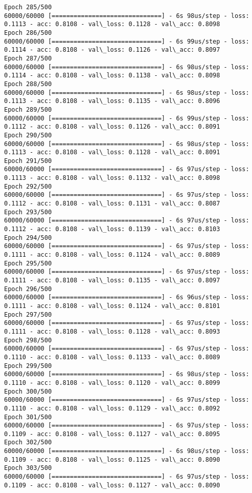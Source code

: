 \documentclass[11pt]{article}
\begin{document}
\begin{Verbatim}[commandchars=\\\{\}]
Epoch 285/500
60000/60000 [==============================] - 6s 98us/step - loss: 0.1113 - acc: 0.8108 - val\_loss: 0.1128 - val\_acc: 0.8098
Epoch 286/500
60000/60000 [==============================] - 6s 99us/step - loss: 0.1114 - acc: 0.8108 - val\_loss: 0.1126 - val\_acc: 0.8097
Epoch 287/500
60000/60000 [==============================] - 6s 98us/step - loss: 0.1114 - acc: 0.8108 - val\_loss: 0.1138 - val\_acc: 0.8098
Epoch 288/500
60000/60000 [==============================] - 6s 98us/step - loss: 0.1113 - acc: 0.8108 - val\_loss: 0.1135 - val\_acc: 0.8096
Epoch 289/500
60000/60000 [==============================] - 6s 99us/step - loss: 0.1112 - acc: 0.8108 - val\_loss: 0.1126 - val\_acc: 0.8091
Epoch 290/500
60000/60000 [==============================] - 6s 98us/step - loss: 0.1113 - acc: 0.8108 - val\_loss: 0.1128 - val\_acc: 0.8091
Epoch 291/500
60000/60000 [==============================] - 6s 97us/step - loss: 0.1113 - acc: 0.8108 - val\_loss: 0.1132 - val\_acc: 0.8098
Epoch 292/500
60000/60000 [==============================] - 6s 97us/step - loss: 0.1112 - acc: 0.8108 - val\_loss: 0.1131 - val\_acc: 0.8087
Epoch 293/500
60000/60000 [==============================] - 6s 97us/step - loss: 0.1112 - acc: 0.8108 - val\_loss: 0.1139 - val\_acc: 0.8103
Epoch 294/500
60000/60000 [==============================] - 6s 97us/step - loss: 0.1111 - acc: 0.8108 - val\_loss: 0.1124 - val\_acc: 0.8089
Epoch 295/500
60000/60000 [==============================] - 6s 97us/step - loss: 0.1111 - acc: 0.8108 - val\_loss: 0.1135 - val\_acc: 0.8097
Epoch 296/500
60000/60000 [==============================] - 6s 96us/step - loss: 0.1111 - acc: 0.8108 - val\_loss: 0.1124 - val\_acc: 0.8101
Epoch 297/500
60000/60000 [==============================] - 6s 97us/step - loss: 0.1111 - acc: 0.8108 - val\_loss: 0.1128 - val\_acc: 0.8093
Epoch 298/500
60000/60000 [==============================] - 6s 97us/step - loss: 0.1110 - acc: 0.8108 - val\_loss: 0.1133 - val\_acc: 0.8089
Epoch 299/500
60000/60000 [==============================] - 6s 98us/step - loss: 0.1110 - acc: 0.8108 - val\_loss: 0.1120 - val\_acc: 0.8099
Epoch 300/500
60000/60000 [==============================] - 6s 97us/step - loss: 0.1110 - acc: 0.8108 - val\_loss: 0.1129 - val\_acc: 0.8092
Epoch 301/500
60000/60000 [==============================] - 6s 97us/step - loss: 0.1109 - acc: 0.8108 - val\_loss: 0.1127 - val\_acc: 0.8095
Epoch 302/500
60000/60000 [==============================] - 6s 98us/step - loss: 0.1109 - acc: 0.8108 - val\_loss: 0.1125 - val\_acc: 0.8090
Epoch 303/500
60000/60000 [==============================] - 6s 97us/step - loss: 0.1109 - acc: 0.8108 - val\_loss: 0.1127 - val\_acc: 0.8090

\end{Verbatim}
\end{document}
